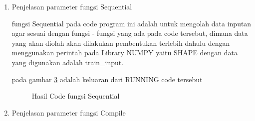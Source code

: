 \begin{enumerate}
\begin{figure}[!htbp]
      \caption{Hasil Code Program training\_split}
      \label{data13}
\end{figure}

\subitem dan berikut ini adalah hasil akhir dari data yang telah dipisahkan menjadi data TEST dan TRAIN dengan data tersebut sudah dilakukan SHUFFLE (acak) terdapat pada gambar \ref{data14}.

\begin{figure}[!htbp]
      \caption{Hasil Code Program training\_split}
      \label{data14}
\end{figure}

\item Penjelasan parameter fungsi Sequential



\subitem fungsi Sequential pada code program ini adalah untuk mengolah data inputan agar sesuai dengan fungsi - fungsi yang ada pada code tersebut, dimana data yang akan diolah akan dilakukan pembentukan terlebih dahulu dengan menggunakan perintah pada Library NUMPY yaitu SHAPE dengan data yang digunakan adalah train\_input.

\subitem pada gambar \ref{data15} adalah keluaran dari RUNNING code tersebut

\begin{figure}[!htbp]
      \caption{Hasil Code fungsi Sequential}
      \label{data15}
\end{figure}

\item Penjelasan parameter fungsi Compile




\end{enumerate}
